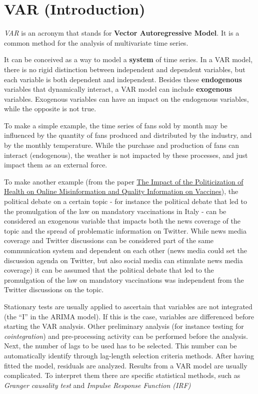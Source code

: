 \documentclass[
]{article}
\begin{document}
\hypertarget{var-introduction}{%
\section{VAR (Introduction)}\label{var-introduction}}

\emph{VAR} is an acronym that stands for \textbf{Vector Autoregressive Model}. It is a common method for the analysis of multivariate time series.

It can be conceived as a way to model a \textbf{system} of time series. In a VAR model, there is no rigid distinction between independent and dependent variables, but each variable is both dependent and independent. Besides these \textbf{endogenous} variables that dynamically interact, a VAR model can include \textbf{exogenous} variables. Exogenous variables can have an impact on the endogenous variables, while the opposite is not true.

To make a simple example, the time series of fans sold by month may be influenced by the quantity of fans produced and distributed by the industry, and by the monthly temperature. While the purchase and production of fans can interact (endogenous), the weather is not impacted by these processes, and just impact them as an external force.

To make another example (from the paper \href{http://www.italiansociologicalreview.com/ojs/index.php?journal=ISR\&page=article\&op=view\&path\%5B\%5D=448\&path\%5B\%5D=346}{The Impact of the Politicization of Health on Online Misinformation and Quality Information on Vaccines}), the political debate on a certain topic - for instance the political debate that led to the promulgation of the law on mandatory vaccinations in Italy - can be considered an exogenous variable that impacts both the news coverage of the topic and the spread of problematic information on Twitter. While news media coverage and Twitter discussions can be considered part of the same communication system and dependent on each other (news media could set the discussion agenda on Twitter, but also social media can stimulate news media coverage) it can be assumed that the political debate that led to the promulgation of the law on mandatory vaccinations was independent from the Twitter discussions on the topic.

Stationary tests are usually applied to ascertain that variables are not integrated (the ``I'' in the ARIMA model). If this is the case, variables are differenced before starting the VAR analysis. Other preliminary analysis (for instance testing for \emph{cointegration}) and pre-processing activity can be performed before the analysis. Next, the number of lags to be used has to be selected. This number can be automatically identify through lag-length selection criteria methods. After having fitted the model, residuals are analyzed. Results from a VAR model are usually complicated. To interpret them there are specific statistical methods, such as \emph{Granger causality test} and \emph{Impulse Response Function (IRF)}
\end{document}
